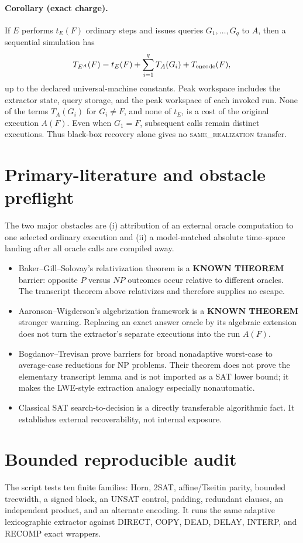 \documentclass[11pt]{article}
\newcommand{\KNOWN}{\textbf{KNOWN THEOREM}}
\newcommand{\same}{\textsc{same\_realization}}
\begin{document}
\paragraph{Corollary (exact charge).}
If $E$ performs $t_E(F)$ ordinary steps and issues queries
$G_1,\ldots,G_q$ to $A$, then a sequential simulation has
\[
 T_{E^A}(F)=t_E(F)+\sum_{i=1}^{q}T_A(G_i)+T_{\rm encode}(F),
\]
up to the declared universal-machine constants.  Peak workspace includes
the extractor state, query storage, and the peak workspace of each invoked
run.  None of the terms $T_A(G_i)$ for $G_i\ne F$, and none of $t_E$, is a
cost of the original execution $A(F)$.  Even when $G_1=F$, subsequent calls
remain distinct executions.  Thus black-box recovery alone gives no
\same{} transfer.

\section{Primary-literature and obstacle preflight}
The two major obstacles are (i) attribution of an external oracle
computation to one selected ordinary execution and (ii) a model-matched
absolute time--space landing after all oracle calls are compiled away.

\begin{itemize}[leftmargin=*]
\item Baker--Gill--Solovay's relativization theorem is a \KNOWN{} barrier:
opposite $P$ versus $NP$ outcomes occur relative to different oracles.  The
transcript theorem above relativizes and therefore supplies no escape.
\item Aaronson--Wigderson's algebrization framework is a \KNOWN{} stronger
warning.  Replacing an exact answer oracle by its algebraic extension does not
turn the extractor's separate executions into the run $A(F)$.
\item Bogdanov--Trevisan prove barriers for broad nonadaptive worst-case to
average-case reductions for NP problems.  Their theorem does not prove the
elementary transcript lemma and is not imported as a SAT lower bound; it makes
the LWE-style extraction analogy especially nonautomatic.
\item Classical SAT search-to-decision is a directly transferable algorithmic
fact.  It establishes external recoverability, not internal exposure.
\end{itemize}

\section{Bounded reproducible audit}
The script
 tests ten finite
families: Horn, 2SAT, affine/Tseitin parity, bounded treewidth, a signed block,
an UNSAT control, padding, redundant clauses, an independent product, and an
alternate encoding.  It runs the same adaptive lexicographic extractor
against DIRECT, COPY, DEAD, DELAY, INTERP, and RECOMP exact wrappers.
\end{document}
